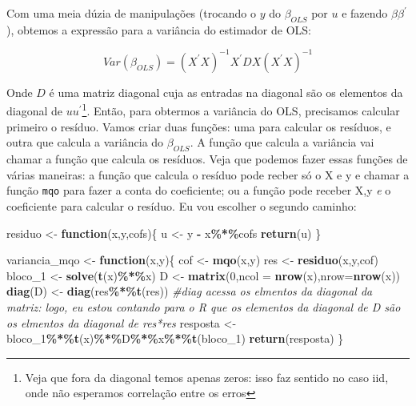 \documentclass[
]{book}
\newenvironment{Shaded}{\begin{snugshade}}{\end{snugshade}}
\newcommand{\CommentTok}[1]{\textcolor[rgb]{0.56,0.35,0.01}{\textit{#1}}}
\newcommand{\ControlFlowTok}[1]{\textcolor[rgb]{0.13,0.29,0.53}{\textbf{#1}}}
\newcommand{\DataTypeTok}[1]{\textcolor[rgb]{0.13,0.29,0.53}{#1}}
\newcommand{\DecValTok}[1]{\textcolor[rgb]{0.00,0.00,0.81}{#1}}
\newcommand{\KeywordTok}[1]{\textcolor[rgb]{0.13,0.29,0.53}{\textbf{#1}}}
\newcommand{\NormalTok}[1]{#1}
\newcommand{\OperatorTok}[1]{\textcolor[rgb]{0.81,0.36,0.00}{\textbf{#1}}}
\newcommand{\StringTok}[1]{\textcolor[rgb]{0.31,0.60,0.02}{#1}}
\begin{document}
Com uma meia dúzia de manipulações (trocando o \(y\) do \(\beta_{OLS}\) por \(u\) e fazendo \(\beta \beta^{'}\)), obtemos a expressão para a variância do estimador de OLS:

\[Var(\beta_{OLS}) = (X^{'}X)^{-1}X^{'}DX(X^{'}X)^{-1}\]

Onde \(D\) é uma matriz diagonal cuja as entradas na diagonal são os elementos da diagonal de \(uu^{'}\)\footnote{Veja que fora da diagonal temos apenas zeros: isso faz sentido no caso iid, onde não esperamos correlação entre os erros}. Então, para obtermos a variância do OLS, precisamos calcular primeiro o resíduo. Vamos criar duas funções: uma para calcular os resíduos, e outra que calcula a variância do \(\beta_{OLS}\). A função que calcula a variância vai chamar a função que calcula os resíduos. Veja que podemos fazer essas funções de várias maneiras: a função que calcula o resíduo pode recber só o X e y e chamar a função \texttt{mqo} para fazer a conta do coeficiente; ou a função pode receber X,y \emph{e} o coeficiente para calcular o resíduo. Eu vou escolher o segundo caminho:

\begin{Shaded}
\begin{Highlighting}[]
\NormalTok{residuo \textless{}{-}}\StringTok{ }\ControlFlowTok{function}\NormalTok{(x,y,cofs)\{}
\NormalTok{  u \textless{}{-}}\StringTok{ }\NormalTok{y }\OperatorTok{{-}}\StringTok{ }\NormalTok{x}\OperatorTok{\%*\%}\NormalTok{cofs}
  \KeywordTok{return}\NormalTok{(u)}
\NormalTok{\}}

\NormalTok{variancia\_mqo \textless{}{-}}\StringTok{ }\ControlFlowTok{function}\NormalTok{(x,y)\{}
\NormalTok{  cof \textless{}{-}}\StringTok{ }\KeywordTok{mqo}\NormalTok{(x,y)}
\NormalTok{  res \textless{}{-}}\StringTok{ }\KeywordTok{residuo}\NormalTok{(x,y,cof)}
\NormalTok{  bloco\_}\DecValTok{1}\NormalTok{ \textless{}{-}}\StringTok{ }\KeywordTok{solve}\NormalTok{(}\KeywordTok{t}\NormalTok{(x)}\OperatorTok{\%*\%}\NormalTok{x)}
\NormalTok{  D \textless{}{-}}\StringTok{ }\KeywordTok{matrix}\NormalTok{(}\DecValTok{0}\NormalTok{,}\DataTypeTok{ncol =} \KeywordTok{nrow}\NormalTok{(x),}\DataTypeTok{nrow=}\KeywordTok{nrow}\NormalTok{(x))}
  \KeywordTok{diag}\NormalTok{(D) \textless{}{-}}\StringTok{ }\KeywordTok{diag}\NormalTok{(res}\OperatorTok{\%*\%}\KeywordTok{t}\NormalTok{(res)) }\CommentTok{\#diag acessa os elmentos da diagonal da matriz: logo, eu estou contando para o R que os elementos da diagonal de D são os elmentos da diagonal de res*res\textquotesingle{}}
\NormalTok{  resposta \textless{}{-}}\StringTok{ }\NormalTok{bloco\_}\DecValTok{1}\OperatorTok{\%*\%}\KeywordTok{t}\NormalTok{(x)}\OperatorTok{\%*\%}\NormalTok{D}\OperatorTok{\%*\%}\NormalTok{x}\OperatorTok{\%*\%}\KeywordTok{t}\NormalTok{(bloco\_}\DecValTok{1}\NormalTok{)}
  \KeywordTok{return}\NormalTok{(resposta)}
\NormalTok{\}}
\end{Highlighting}
\end{Shaded}
\end{document}
